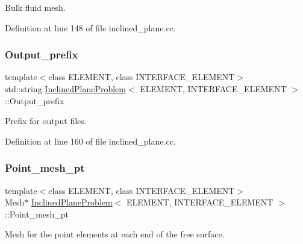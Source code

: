 Bulk fluid mesh. 



Definition at line 148 of file inclined\+\_\+plane.\+cc.

\mbox{\label{classInclinedPlaneProblem_a6ad45c76bd24f63c0162313042ce2e7d}} 
\subsubsection{\texorpdfstring{Output\+\_\+prefix}{Output\_prefix}}
{\footnotesize\ttfamily template$<$class E\+L\+E\+M\+E\+NT, class I\+N\+T\+E\+R\+F\+A\+C\+E\+\_\+\+E\+L\+E\+M\+E\+NT$>$ \\
std\+::string \hyperlink{classInclinedPlaneProblem}{Inclined\+Plane\+Problem}$<$ E\+L\+E\+M\+E\+NT, I\+N\+T\+E\+R\+F\+A\+C\+E\+\_\+\+E\+L\+E\+M\+E\+NT $>$\+::Output\+\_\+prefix\hspace{0.3cm}{\ttfamily [protected]}}



Prefix for output files. 



Definition at line 160 of file inclined\+\_\+plane.\+cc.

\mbox{\label{classInclinedPlaneProblem_adefbac5880323d7de622e2ba0c526746}} 
\subsubsection{\texorpdfstring{Point\+\_\+mesh\+\_\+pt}{Point\_mesh\_pt}}
{\footnotesize\ttfamily template$<$class E\+L\+E\+M\+E\+NT, class I\+N\+T\+E\+R\+F\+A\+C\+E\+\_\+\+E\+L\+E\+M\+E\+NT$>$ \\
Mesh$\ast$ \hyperlink{classInclinedPlaneProblem}{Inclined\+Plane\+Problem}$<$ E\+L\+E\+M\+E\+NT, I\+N\+T\+E\+R\+F\+A\+C\+E\+\_\+\+E\+L\+E\+M\+E\+NT $>$\+::Point\+\_\+mesh\+\_\+pt\hspace{0.3cm}{\ttfamily [protected]}}



Mesh for the point elements at each end of the free surface. 



